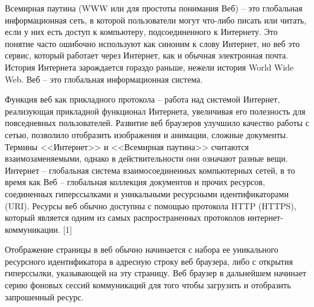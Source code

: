 Всемирная паутина (WWW или для простоты понимания Веб) -- это глобальная информационная сеть, в которой пользователи могут что-либо писать или читать, если у них есть доступ к компьютеру, подсоединенного к Интернету.
Это понятие часто ошибочно используют как синоним к слову Интернет, но веб это сервис, который работает через Интернет, как и обычная электронная почта. История Интернета зарождается гораздо раньше, нежели история World Wide Web.
Веб -- это глобальная информационная система.

Функция веб как прикладного протокола -- работа над системой Интернет, реализующая прикладной функционал Интернета, увеличивая его полезность для повседневных пользователей.
Развитие веб браузеров улучшило качество работы с сетью, позволило отобразить изображения и анимации, сложные документы. Термины <<Интернет>> и <<Всемирная паутина>> считаются взаимозаменяемыми, однако
в действительности они означают разные вещи. Интернет -- глобальная система взаимосоединенных компьютерных сетей, в то время как Веб -- глобальная коллекция документов и прочих ресурсов, соединенных гиперссылками и
уникальными ресурсными идентификаторами (URI). Ресурсы веб обычно доступны с помощью протокола HTTP (HTTPS), который является одним из самых распространенных протоколов интернет-коммуникации. [1]

Отображение страницы в веб обычно начинается с набора ее уникального ресурсного идентификатора в адресную строку веб браузера, либо с открытия гиперссылки, указывающей на эту страницу.
Веб браузер в дальнейшем начинает серию фоновых сессий коммуникаций для того чтобы загрузить и отобразить запрошенный ресурс.

